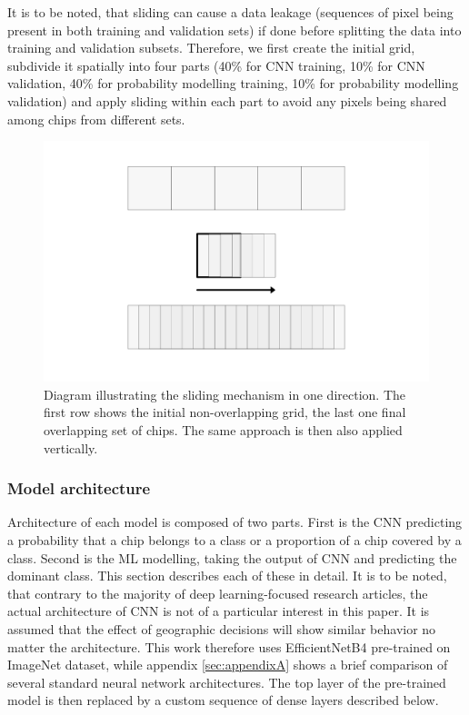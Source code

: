 It is to be noted, that sliding can cause a data leakage (sequences of pixel being
present in both training and validation sets) if done before splitting the data into
training and validation subsets. Therefore, we first create the initial grid, subdivide
it spatially into four parts (40\% for CNN training, 10\% for CNN validation, 40\% for
probability modelling training, 10\% for probability modelling validation) and apply
sliding within each part to avoid any pixels being shared among chips from different
sets.

\begin{figure}
    \centering
    \includegraphics[width=.8\linewidth]{fig/sliding.png}
    \caption{Diagram illustrating the sliding mechanism in one direction. The first row shows the initial non-overlapping grid, the last one final overlapping set of chips. The same approach is then also applied vertically.}
    \label{fig:sliding}
\end{figure}


\subsubsection{Model architecture}



Architecture of each model is composed of two parts. First is the CNN predicting a
probability that a chip belongs to a class or a proportion of a chip covered by a class.
Second is the ML modelling, taking the output of CNN and predicting the dominant class.
This section describes each of these in detail. It is to be noted, that contrary to the
majority of deep learning-focused research articles, the actual architecture of CNN is
not of a particular interest in this paper. It is assumed that the effect of geographic
decisions will show similar behavior no matter the architecture. This work therefore
uses EfficientNetB4 pre-trained on ImageNet dataset, while appendix \ref*{sec:appendixA}
shows a brief comparison of several standard neural network architectures. The top layer
of the pre-trained model is then replaced by a custom sequence of dense layers described
below.

